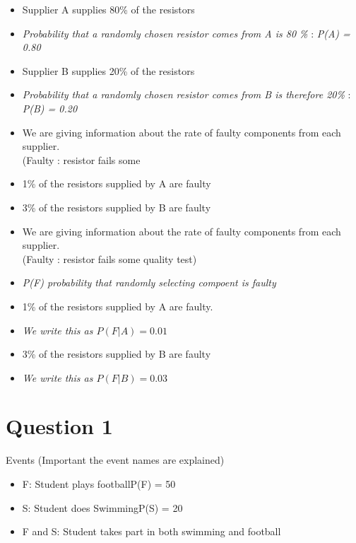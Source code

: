 \documentclass[]{report}
\begin{document}
\begin{framed}
\begin{itemize}
\item Supplier A supplies 80\% of the resistors
\item \textit{Probability that a randomly chosen resistor comes from A is 80 \%} : \textit{P(A) = 0.80 }
\item Supplier B supplies 20\% of the resistors
\item \textit{Probability that a randomly chosen resistor comes from B is therefore 20\%} : \textit{P(B) = 0.20}
\end{itemize}
\end{framed}



\begin{itemize}
\item We are giving information about the rate of faulty components from each supplier. \\(Faulty : resistor fails some 
\item 1\% of the resistors supplied by A are faulty

\item 3\% of the resistors supplied by B are faulty 
\vspace{1cm}
\end{itemize}

\begin{itemize}
\item We are giving information about the rate of faulty components from each supplier. \\(Faulty : resistor fails some quality test)
\item  \textit{P(F) probability that randomly selecting compoent is faulty}
\item 1\% of the resistors supplied by A are faulty.
\item\textit{ We write this as $P(F|A) =0.01$}
\item 3\% of the resistors supplied by B are faulty 
\item \textit{We write this as $P(F|B) =0.03$}
\end{itemize}
\newpage



\section{Question 1}
Events  (Important the event names are explained)

\begin{itemize}
\item F: Student plays footballP(F) = 50%
\item S: Student does SwimmingP(S) = 20%
\item F and S:            Student takes part in both swimming and football  
\end{itemize}
\end{document}
